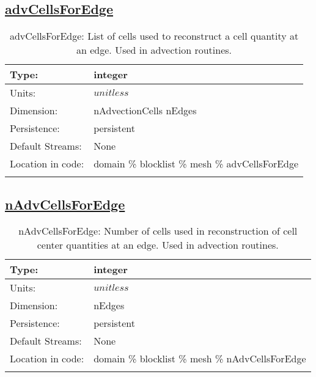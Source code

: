 \subsection[advCellsForEdge]{\hyperref[sec:var_tab_mesh]{advCellsForEdge}}
\label{subsec:var_sec_mesh_advCellsForEdge}
\begin{center}
\begin{longtable}{| p{2.0in} | p{4.0in} |}
        \hline 
        Type: & integer \\
        \hline 
        Units: & $unitless$ \\
        \hline 
        Dimension: & nAdvectionCells nEdges \\
        \hline 
        Persistence: & persistent \\
        \hline 
		 Default Streams: & None \\
        \hline 
		 Location in code: & domain \% blocklist \% mesh \% advCellsForEdge \\
		 \hline 
    \caption{advCellsForEdge: List of cells used to reconstruct a cell quantity at an edge. Used in advection routines.}
\end{longtable}
\end{center}
\subsection[nAdvCellsForEdge]{\hyperref[sec:var_tab_mesh]{nAdvCellsForEdge}}
\label{subsec:var_sec_mesh_nAdvCellsForEdge}
\begin{center}
\begin{longtable}{| p{2.0in} | p{4.0in} |}
        \hline 
        Type: & integer \\
        \hline 
        Units: & $unitless$ \\
        \hline 
        Dimension: & nEdges \\
        \hline 
        Persistence: & persistent \\
        \hline 
		 Default Streams: & None \\
        \hline 
		 Location in code: & domain \% blocklist \% mesh \% nAdvCellsForEdge \\
		 \hline 
    \caption{nAdvCellsForEdge: Number of cells used in reconstruction of cell center quantities at an edge. Used in advection routines.}
\end{longtable}
\end{center}
